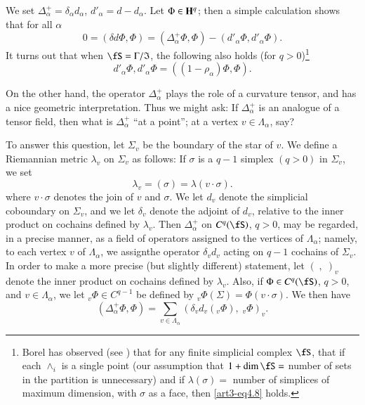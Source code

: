 \begin{remark*}
We set $\Delta^+_\alpha = \delta_\alpha d_\alpha$, $d'_\alpha = d - d_\alpha$. Let $\Phi \in \mathbf{H}^q$; then a simple calculation shows that for all $\alpha$
\begin{equation}
0 = (\delta d \Phi, \Phi) = (\Delta^+_\alpha \Phi, \Phi) - (d'_\alpha \Phi, d'_\alpha \Phi). \label{art3-eq4.7}
\end{equation}
It turns out that when $\fS = \Gamma / \fI$, the following also holds (for $q > 0$)\footnote{Borel has observed (see \cite{art3-key27}) that for any finite simplicial complex $\fS$, that if each $\wedge_i$ is a single point (our assumption that $1+ \dim \fS = $ number of sets in the partition is unnecessary) and if $\lambda (\sigma) =$ number of simplices of maximum dimension, with $\sigma$ as a face, then \eqref{art3-eq4.8} holds.}
\begin{equation}
d'_\alpha \Phi, d'_\alpha \Phi = ((1-\rho_\alpha) \Phi, \Phi). \label{art3-eq4.8}
\end{equation}

On the other hand, the operator $\Delta^+_\alpha$ plays the role of a curvature tensor, and has a nice geometric interpretation. Thus we might ask: If $\Delta^+_\alpha$ is an analogue of a tensor field, then what is $\Delta^+_\alpha$ ``at a point''; \iec at a vertex $v \in \Lambda_\alpha$, say?

To answer this question, let $\Sigma_v$ be the  boundary of the star of $v$. We define a Riemannian metric $\lambda_v$ on $\Sigma_v$ as follows: If $\sigma$ is a $q-1$ simplex $(q > 0)$ in $\Sigma_v$, we set
$$
\lambda_v = (\sigma) = \lambda (v \cdot \sigma).
$$
where $v \cdot \sigma$ denotes the join of $v$ and $\sigma$. We let $d_v$ denote the simplicial coboundary on $\Sigma_v$, and we let $\delta_v$ denote the adjoint of $d_v$, relative to the inner product on cochains defined by $\lambda_v$. Then $\Delta^+_\alpha$ on $C^q (\fS)$, $q>0$, may be regarded, in a precise manner, as a field of operators assigned to the vertices of $\Lambda_\alpha$; namely, to each vertex $v$ of $\Lambda_\alpha$, we assign\pageoriginale the operator $\delta_v d_v$ acting on $q-1$ cochains of $\Sigma_v$. In order to make a more precise (but slightly different) statement, let $(\;,\;)_v$ denote the inner product on cochains defined by $\lambda_v$. Also, if $\Phi \in C^q (\fS)$, $q>0$, and $v \in \Lambda_\alpha$, we let ${}_v \Phi \in C^{q-1}$ be defined by ${}_v \Phi (\Sigma) = \Phi (v \cdot \sigma)$.
We then have 
\begin{equation}
(\Delta^+_\alpha \Phi, \Phi) = \sum\limits_{v \in \Lambda_\alpha} (\delta_v d_v (_v \Phi), \; {}_v \Phi)_v.
\label{art3-eq4.9}
\end{equation}


\end{remark*}
